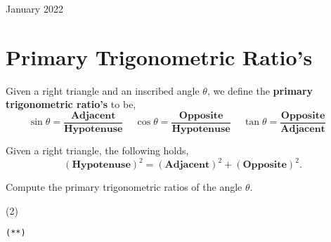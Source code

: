 \documentclass[12pt,oneside]{book} %
\begin{document}
\begin{lec}{January 2022}
\begin{ex}
    \newpage

  \end{ex}

  \section{Primary Trigonometric Ratio's}
  \begin{defn}
      Given a right triangle and an inscribed angle $\theta$, we define the \textbf{primary trigonometric ratio's}
      to be,
      \[
          \sin \theta = \frac{\textbf{Adjacent}}{\textbf{Hypotenuse}}\,\,\,\,\,\,\,
          \cos \theta = \frac{\textbf{Opposite}}{\textbf{Hypotenuse}}\,\,\,\,\,\,\,
          \tan \theta = \frac{\textbf{Opposite}}{\textbf{Adjacent}}\,\,\,\,\,\,\,
      \] 
  \end{defn}

  \begin{thrm} Given a right triangle, the following holds,
    \[
          \left( \textbf{Hypotenuse} \right) ^2 = \left( \textbf{Adjacent} \right) ^2 + 
                                          \left( \textbf{Opposite} \right) ^2
    .\] 
    
  \end{thrm}

  \begin{ex}
    Compute the primary trigonometric ratios of the angle $\theta$.
    
    \begin{tasks}(2)
      \task \texttt{  }\\

      \task \texttt{(**)}\\
\end{tasks}
\end{ex}
\end{lec}
\end{document}
